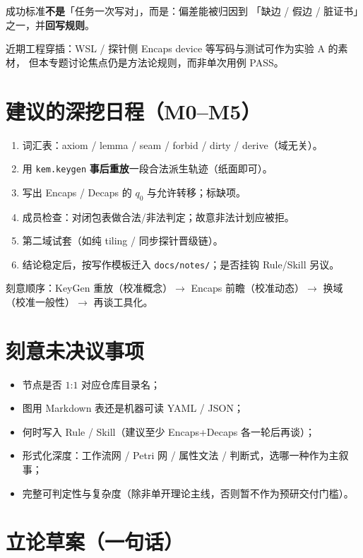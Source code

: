 \documentclass[UTF8,a4paper,11pt]{ctexart}
\begin{document}
成功标准\textbf{不是}「任务一次写对」，而是：偏差能被归因到
「缺边 / 假边 / 脏证书」之一，并\textbf{回写规则}。

近期工程穿插：WSL / 探针侧 Encaps device 等写码与测试可作为实验 A 的素材，
但本专题讨论焦点仍是方法论规则，而非单次用例 PASS。

\section{建议的深挖日程（M0--M5）}

\begin{enumerate}
  \item[\textbf{M0}] 词汇表：axiom / lemma / seam / forbid / dirty / derive（域无关）。
  \item[\textbf{M1}] 用 \texttt{kem.keygen} \textbf{事后重放}一段合法派生轨迹（纸面即可）。
  \item[\textbf{M2}] 写出 Encaps / Decaps 的 $q_0$ 与允许转移；标缺项。
  \item[\textbf{M3}] 成员检查：对闭包表做合法/非法判定；故意非法计划应被拒。
  \item[\textbf{M4}] 第二域试套（如纯 tiling / 同步探针晋级链）。
  \item[\textbf{M5}] 结论稳定后，按写作模板迁入 \texttt{docs/notes/}；是否挂钩 Rule/Skill 另议。
\end{enumerate}

刻意顺序：KeyGen 重放（校准概念）$\to$ Encaps 前瞻（校准动态）$\to$ 换域（校准一般性）$\to$ 再谈工具化。

\section{刻意未决议事项}

\begin{itemize}
  \item 节点是否 $1$:$1$ 对应仓库目录名；
  \item 图用 Markdown 表还是机器可读 YAML / JSON；
  \item 何时写入 Rule / Skill（建议至少 Encaps+Decaps 各一轮后再谈）；
  \item 形式化深度：工作流网 / Petri 网 / 属性文法 / 判断式，选哪一种作为主叙事；
  \item 完整可判定性与复杂度（除非单开理论主线，否则暂不作为预研交付门槛）。
\end{itemize}

\section{立论草案（一句话）}
\end{document}

